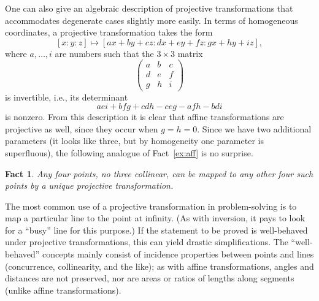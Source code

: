 \documentclass[12pt]{book}
\numberwithin{exc}{section}
\numberwithin{figure}{section}
\newtheorem{fact}[theorem]{Fact}
\numberwithin{equation}{theorem}
\begin{document}
One can also give an algebraic description of projective 
transformations that accommodates degenerate cases slightly more 
easily. In terms of homogeneous coordinates, a projective 
transformation takes the form
\[
[x : y : z] \mapsto [ax + by + cz : dx + ey + fz: gx + hy + iz],
\]
where $a, \dots, i$ are numbers such that the $3 \times 3$ matrix
\[
\begin{pmatrix} a & b & c \\ d & e & f \\ g & h & i \end{pmatrix}
\]
is invertible, i.e., its determinant
\[
aei + bfg + cdh - ceg - afh - bdi
\]
is nonzero. From this description it is clear that affine transformations 
are projective as well, since they occur when $g = h = 0$. Since we 
have two additional parameters (it looks like three, but by 
homogeneity one parameter is superfluous), the following analogue of 
Fact~\ref{ex:aff} is no surprise.
\begin{fact}
Any four points, no three collinear, can be mapped to any other four 
such points by a unique projective transformation.
\end{fact}

The most common use of a projective transformation in problem-solving 
is to map a particular line to the point at infinity. (As with 
inversion, it pays to look for a ``busy'' line for this purpose.) If the 
statement to be proved is well-behaved under projective 
transformations, this can yield drastic simplifications. The 
``well-behaved'' concepts mainly consist of incidence properties 
between points and lines (concurrence, collinearity, and the like); 
as with affine transformations, angles and distances are not 
preserved, nor are areas or ratios of lengths along segments (unlike 
affine transformations).
\end{document}
